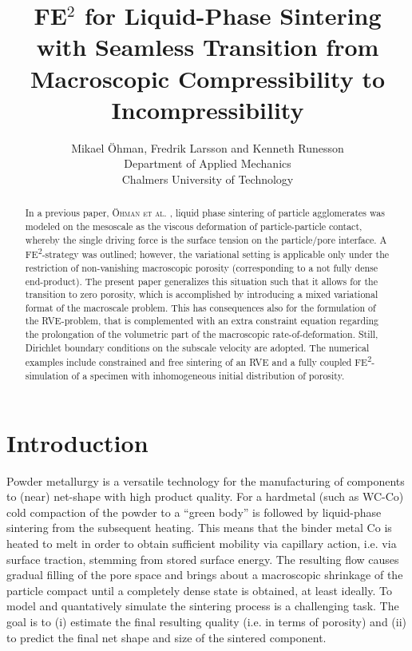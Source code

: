 \documentclass[10pt,a4paper]{article}
\begin{document}
\title{FE$^2$ for Liquid-Phase Sintering with Seamless Transition from Macroscopic Compressibility to Incompressibility}

\author{
Mikael Öhman, Fredrik Larsson and Kenneth Runesson\\
Department of Applied Mechanics \\
Chalmers University of Technology}

\maketitle

\begin{abstract}
\noindent In a previous paper, \textsc{Öhman et al.} \cite{OhmanRunLar2011}, liquid phase sintering of particle agglomerates was modeled on the mesoscale as the viscous deformation of particle-particle contact, whereby the single driving force is the surface tension on the particle/pore interface. A FE\textsuperscript{2}-strategy was outlined; however, the variational setting is applicable only under the restriction of non-vanishing macroscopic porosity (corresponding to a not fully dense end-product). The present paper generalizes this situation such that it allows for the transition to zero porosity, which is accomplished by introducing a mixed variational format of the macroscale problem. This has consequences also for the formulation of the RVE-problem, that is complemented with an extra constraint equation regarding the prolongation of the volumetric part of the macroscopic rate-of-deformation. Still, Dirichlet boundary conditions on the subscale velocity are adopted. The numerical examples include constrained and free sintering of an RVE and a fully coupled FE\textsuperscript{2}-simulation of a specimen with inhomogeneous initial distribution of porosity.

\end{abstract}

\section{Introduction}

Powder metallurgy is a versatile technology for the manufacturing of components to (near) net-shape with high product quality. For a hardmetal (such as WC-Co) cold compaction of the powder to a ``green body'' is followed by liquid-phase sintering from the subsequent heating. This means that the binder metal Co is heated to melt in order to obtain sufficient mobility via capillary action, i.e. via surface traction, stemming from stored surface energy. The resulting flow causes gradual filling of the pore space and brings about a macroscopic shrinkage of the particle compact until a completely dense state is obtained, at least ideally. To model and quantatively simulate the sintering process is a challenging task. The goal is to (i) estimate the final resulting quality (i.e. in terms of porosity) and (ii) to predict the final net shape and size of the sintered component.
\end{document}
